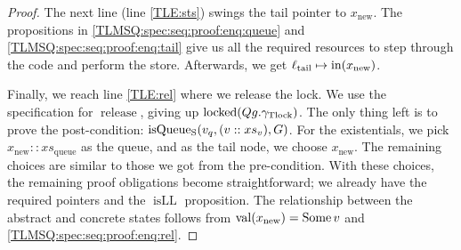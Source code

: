 \documentclass[a4paper, 10pt]{report}
\theoremstyle{definition}
\newcommand{\locked}{\operatorname{locked}}
\newcommand{\release}{\operatorname{release}}
\newcommand{\isqueueseq}{\operatorname{isQueue_{S}}}
\newcommand{\vq}{v_q}
\newcommand{\xsqueue}{xs_{\mathrm{queue}}}
\newcommand{\isLL}{\operatorname{isLL}}
\newcommand{\locN}[1]{\loc_{\mathrm{#1}}}
\newcommand{\loctail}{\locN{tail}}
\newcommand{\nIn}[1]{\operatorname{in}(#1)}
\newcommand{\nVal}[1]{\operatorname{val}(#1)}
\newcommand{\node}{x}
\newcommand{\nodeN}[1]{\node_{\mathrm{#1}}}
\newcommand{\nodenew}{\nodeN{new}}
\newcommand{\absvalue}{\val}
\newcommand{\absvalueList}{xs_v}
\newcommand{\Qg}{G}
\newcommand{\gtlock}{\gname_{\mathrm{Tlock}}}
\begin{document}
\begin{proof}
The next line (line \ref{TLE:sts}) swings the tail pointer to $\nodenew$. The propositions in \ref{TLMSQ:spec:seq:proof:enq:queue} and \ref{TLMSQ:spec:seq:proof:enq:tail} give us all the required resources to step through the code and perform the store. Afterwards, we get $\loctail \mapsto \nIn{\nodenew}$.

Finally, we reach line \ref{TLE:rel} where we release the lock. We use the specification for $\release$, giving up $\locked(Qg.\gtlock)$. The only thing left is to prove the post-condition: $\isqueueseq(\vq, (\absvalue :: \absvalueList), \Qg)$. For the existentials, we pick $\nodenew :: \xsqueue$ as the queue, and as the tail node, we choose $\nodenew$. The remaining choices are similar to those we got from the pre-condition. With these choices, the remaining proof obligations become straightforward; we already have the required pointers and the $\isLL$ proposition. The relationship between the abstract and concrete states follows from $\nVal{\nodenew} = \Some \absvalue$ and \ref{TLMSQ:spec:seq:proof:enq:rel}.
\end{proof}
\end{document}
